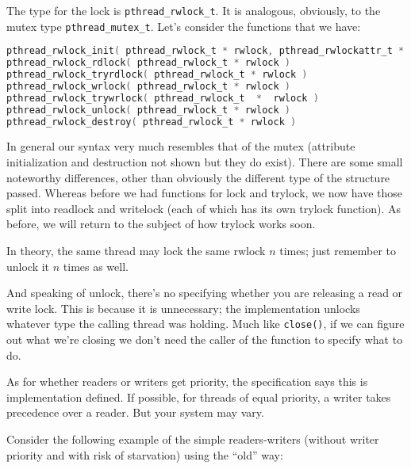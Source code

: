 The type for the lock is \texttt{pthread\_rwlock\_t}. It is analogous, obviously, to the mutex type \texttt{pthread\_mutex\_t}. Let's consider the functions that we have:

\begin{lstlisting}[language=C]
pthread_rwlock_init( pthread_rwlock_t * rwlock, pthread_rwlockattr_t * attr )
pthread_rwlock_rdlock( pthread_rwlock_t * rwlock )
pthread_rwlock_tryrdlock( pthread_rwlock_t * rwlock )
pthread_rwlock_wrlock( pthread_rwlock_t * rwlock )
pthread_rwlock_trywrlock( pthread_rwlock_t  *  rwlock )
pthread_rwlock_unlock( pthread_rwlock_t * rwlock )
pthread_rwlock_destroy( pthread_rwlock_t * rwlock )
\end{lstlisting}

In general our syntax very much resembles that of the mutex (attribute initialization and destruction not shown but they do exist). There are some small noteworthy differences, other than obviously the different type of the structure passed. Whereas before we had functions for lock and trylock, we now have those split into readlock and writelock (each of which has its own trylock function). As before, we will return to the subject of how trylock works soon.

In theory, the same thread may lock the same rwlock $n$ times; just remember to unlock it $n$ times as well.

And speaking of unlock, there's no specifying whether you are releasing a read or write lock. This is because it is unnecessary; the implementation unlocks whatever type the calling thread was holding. Much like \texttt{close()}, if we can figure out what we're closing we don't need the caller of the function to specify what to do.

As for whether readers or writers get priority, the specification says this is implementation defined. If possible, for threads of equal priority, a writer takes precedence over a reader. But your system may vary.

Consider the following example of the simple readers-writers (without writer priority and with risk of starvation) using the ``old'' way:

